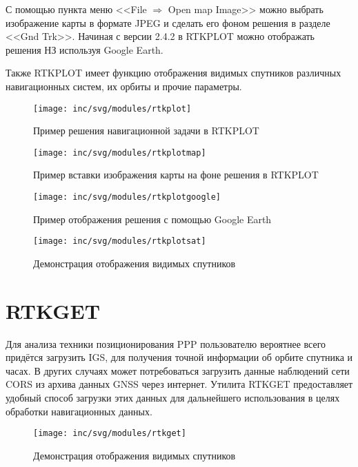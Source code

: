 С помощью пункта меню <<File $\Rightarrow$ Open map Image>> можно выбрать изображение карты в формате JPEG и сделать его фоном решения в разделе <<Gnd Trk>>. Начиная с версии 2.4.2 в RTKPLOT можно отображать решения НЗ используя Google Earth.

Также RTKPLOT имеет функцию отображения видимых спутников различных навигационных систем, их орбиты и прочие параметры.

\begin{figure}[h!]
	\centering
	\texttt{[image: inc/svg/modules/rtkplot]}
	\caption{Пример решения навигационной задачи в RTKPLOT}
	\label{fig:rtkplot}
\end{figure}
\begin{figure}[h!]
	\centering
	\texttt{[image: inc/svg/modules/rtkplotmap]}
	\caption{Пример вставки изображения карты на фоне решения в RTKPLOT}
	\label{fig:rtkplotmap}
\end{figure}
\begin{figure}[h!]
	\centering
	\texttt{[image: inc/svg/modules/rtkplotgoogle]}
	\caption{Пример отображения решения с помощью Google Earth}
	\label{fig:rtkplotgoogle}
\end{figure}
\clearpage
\begin{figure}[h!]
	\centering
	\texttt{[image: inc/svg/modules/rtkplotsat]}
	\caption{Демонстрация отображения видимых спутников}
	\label{fig:rtkplotsat}
\end{figure}
\section{RTKGET}
Для анализа техники позиционирования PPP пользователю вероятнее всего придётся загрузить IGS, для получения точной информации об орбите спутника и часах. В других случаях может потребоваться загрузить данные наблюдений сети CORS из архива данных GNSS через интернет. Утилита RTKGET предоставляет удобный способ загрузки этих данных для дальнейшего использования в целях обработки навигационных данных.
\begin{figure}[ht]
	\centering
	\texttt{[image: inc/svg/modules/rtkget]}
	\caption{Демонстрация отображения видимых спутников}
	\label{fig:rtkget}
\end{figure}

